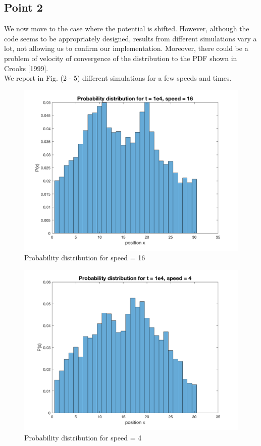 \documentclass[11pt,letterpaper]{article}
\begin{document}
\subsection{Point 2}
We now move to the case where the potential is shifted. However, although the code seems to be appropriately designed, results from different simulations vary a lot, not allowing us to confirm our implementation. Moreover, there could be a problem of velocity of convergence of the distribution to the PDF shown in Crooks [1999].\\
We report in Fig. (2 - 5) different simulations for a few speeds and times.

\begin{figure}
\centering
\includegraphics[width=0.9\linewidth]{./prob_6_1e4}
\caption{Probability distribution for speed = 16}
\label{fig:prob_16}
\end{figure}

\begin{figure}
\centering
\includegraphics[width=0.9\linewidth]{./prob_4_1e4}
\caption{Probability distribution for speed = 4}
\label{fig:prob_4}
\end{figure}
\end{document}

